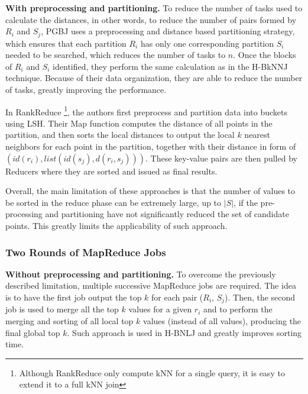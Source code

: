 \textbf{With preprocessing and partitioning.} To reduce the number of tasks used to calculate the distances, in other words, to reduce the number of pairs formed by $R_i$ and $S_j$, PGBJ \cite{Lu:2012:EPK:2336664.2336674} uses a preprocessing and distance based partitioning strategy, which ensures that each partition $R_i$ has only one corresponding partition $S_i$ needed to be searched, which reduces the number of tasks to $n$. %
Once the blocks of $R_i$ and $S_i$ identified, they perform the same calculation as in the H-BkNNJ technique. Because of 
their data organization, they are able to reduce the number of tasks, greatly improving the performance.

In RankReduce \cite{Stupar10rankreduce-}\footnote{Although RankReduce only compute kNN for a single query, it is 
easy to extend it to a full kNN join}, the authors first preprocess and partition data into buckets using 
LSH. Their Map function computes the distance of all points in the partition, and then sorts the local distances to output the local 
 $k$ nearest neighbors for each point in the partition, together with their distance in form of $\left(id(r_i), list
\left( id(s_{j}), d\left(r_i, s_j\right)\right)\right)$.
These key-value pairs are then pulled by Reducers where they are sorted and issued as final results.

Overall, the main limitation of these approaches is that the number of values to be sorted in the reduce phase
can be extremely large, up to $\left|S\right|$, if the
pre-processing and partitioning have not significantly reduced the set of candidate points.
This greatly limits the applicability of such approach. 


\subsubsection{Two Rounds of MapReduce Jobs}
\textbf{Without preprocessing and partitioning.} 
To overcome the previously described limitation, multiple successive MapReduce jobs are required. The idea is to have the first job output
the top $k$ for each pair ($R_i$, $S_j$). Then, the second job is used to merge all the top $k$ values for a 
given $r_i$ and to perform the merging and sorting of all local top $k$ values (instead of all values), producing the final global top $k$. Such approach is used in H-BNLJ 
\cite{Zhang:2012:EPK:2247596.2247602} and greatly improves sorting time. %


